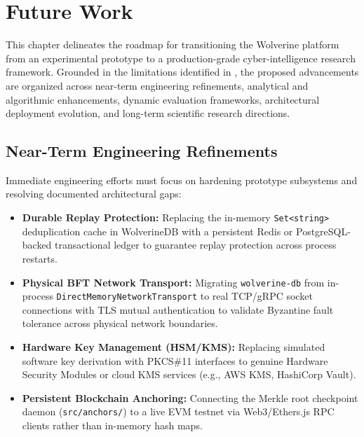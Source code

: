 \chapter{Future Work}
\label{ch:future-work}

This chapter delineates the roadmap for transitioning the Wolverine platform from an experimental prototype to a production-grade cyber-intelligence research framework. Grounded in the limitations identified in , the proposed advancements are organized across near-term engineering refinements, analytical and algorithmic enhancements, dynamic evaluation frameworks, architectural deployment evolution, and long-term scientific research directions.

\section{Near-Term Engineering Refinements}
\label{sec:future-engineering}
Immediate engineering efforts must focus on hardening prototype subsystems and resolving documented architectural gaps:
\begin{itemize}
    \item \textbf{Durable Replay Protection:} Replacing the in-memory \texttt{Set<string>} deduplication cache in WolverineDB with a persistent Redis or PostgreSQL-backed transactional ledger to guarantee replay protection across process restarts.
    \item \textbf{Physical BFT Network Transport:} Migrating \texttt{wolverine-db} from in-process \texttt{DirectMemoryNetworkTransport} to real TCP/gRPC socket connections with TLS mutual authentication to validate Byzantine fault tolerance across physical network boundaries.
    \item \textbf{Hardware Key Management (HSM/KMS):} Replacing simulated software key derivation with PKCS\#11 interfaces to genuine Hardware Security Modules or cloud KMS services (e.g., AWS KMS, HashiCorp Vault).
    \item \textbf{Persistent Blockchain Anchoring:} Connecting the Merkle root checkpoint daemon (\texttt{src/anchors/}) to a live EVM testnet via Web3/Ethers.js RPC clients rather than in-memory hash maps.
\end{itemize}

